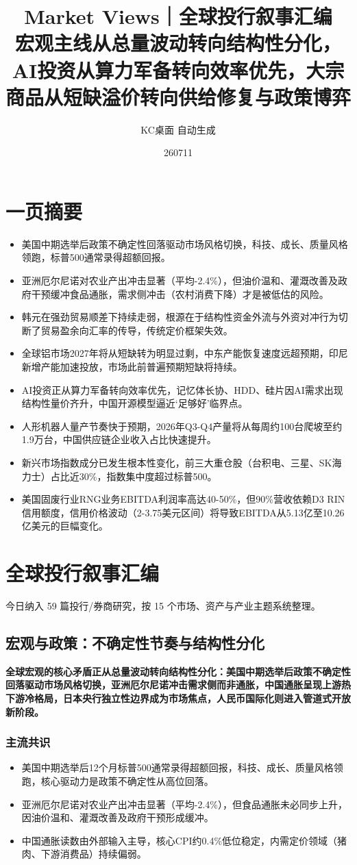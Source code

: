 \documentclass[11pt]{ctexart}
\title{\textbf{Market Views｜全球投行叙事汇编}\\[0.4em]{\large 宏观主线从总量波动转向结构性分化，AI投资从算力军备转向效率优先，大宗商品从短缺溢价转向供给修复与政策博弈}}
\author{KC桌面 自动生成}
\date{260711}
\begin{document}
\maketitle
\tableofcontents
\newpage
\section{一页摘要}
\begin{itemize}
  \item 美国中期选举后政策不确定性回落驱动市场风格切换，科技、成长、质量风格领跑，标普500通常录得超额回报。
  \item 亚洲厄尔尼诺对农业产出冲击显著（平均-2.4\%），但油价温和、灌溉改善及政府干预缓冲食品通胀，需求侧冲击（农村消费下降）才是被低估的风险。
  \item 韩元在强劲贸易顺差下持续走弱，根源在于结构性资金外流与外资对冲行为切断了贸易盈余向汇率的传导，传统定价框架失效。
  \item 全球铝市场2027年将从短缺转为明显过剩，中东产能恢复速度远超预期，印尼新增产能加速投放，市场此前普遍预期短缺将持续。
  \item AI投资正从算力军备转向效率优先，记忆体长协、HDD、硅片因AI需求出现结构性量价齐升，中国开源模型逼近‘足够好’临界点。
  \item 人形机器人量产节奏快于预期，2026年Q3-Q4产量将从每周约100台爬坡至约1.9万台，中国供应链企业收入占比快速提升。
  \item 新兴市场指数成分已发生根本性变化，前三大重仓股（台积电、三星、SK海力士）占比近30\%，指数集中度超过标普500。
  \item 美国固废行业RNG业务EBITDA利润率高达40-50\%，但90\%营收依赖D3 RIN信用额度，信用价格波动（2-3.75美元区间）将导致EBITDA从5.13亿至10.26亿美元的巨幅变化。
\end{itemize}
\section{全球投行叙事汇编}
今日纳入 59 篇投行/券商研究，按 15 个市场、资产与产业主题系统整理。
\newpage
\subsection{宏观与政策：不确定性节奏与结构性分化}
\textbf{全球宏观的核心矛盾正从总量波动转向结构性分化：美国中期选举后政策不确定性回落驱动市场风格切换，亚洲厄尔尼诺冲击需求侧而非通胀，中国通胀呈现上游热下游冷格局，日本央行独立性边界成为市场焦点，人民币国际化则进入管道式开放新阶段。}
\subsubsection*{主流共识}
\begin{itemize}
  \item 美国中期选举后12个月标普500通常录得超额回报，科技、成长、质量风格领跑，核心驱动力是政策不确定性从高位回落。
  \item 亚洲厄尔尼诺对农业产出冲击显著（平均-2.4\%），但食品通胀未必同步上升，因油价温和、灌溉改善及政府干预形成缓冲。
  \item 中国通胀读数由外部输入主导，核心CPI约0.4\%低位稳定，内需定价领域（猪肉、下游消费品）持续偏弱。
\end{itemize}
\end{document}
